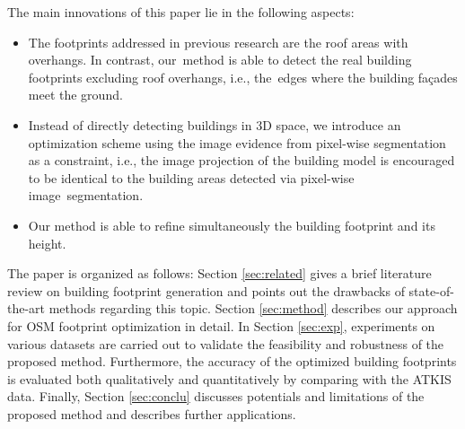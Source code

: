 \documentclass[remotesensing,article,accept,moreauthors,pdftex,10pt,a4paper]{mdpi}
\theoremstyle{mdpi}
\newcounter{ex}
\newcounter{re}
\begin{document}
The main innovations of this paper lie in the following aspects:
\begin{itemize}[leftmargin=*,labelsep=5.5mm]
\item The footprints addressed in previous research are the roof areas with overhangs. In contrast, our~method is able to detect the real building footprints excluding roof overhangs, i.e., the~edges where the building fa\c{c}ades meet the ground.
\item Instead of directly detecting buildings in 3D space, we introduce an optimization scheme using the image evidence from pixel-wise segmentation as a constraint, i.e., the image projection of the building model is encouraged to be identical to the building areas detected via pixel-wise image~segmentation. 
\item Our method is able to refine simultaneously the building footprint and its height.  
\end{itemize}


The paper is organized as follows: Section \ref{sec:related} gives a brief literature review on building footprint generation and points out the drawbacks of state-of-the-art methods regarding this topic. Section \ref{sec:method} describes our approach for OSM footprint optimization in detail. In Section \ref{sec:exp}, experiments on various datasets are carried out to validate the feasibility and robustness of the proposed method. Furthermore, the accuracy of the optimized building footprints is evaluated both qualitatively and quantitatively by comparing with the ATKIS data. Finally, Section \ref{sec:conclu} discusses potentials and limitations of the proposed method and describes further applications.
\end{document}
